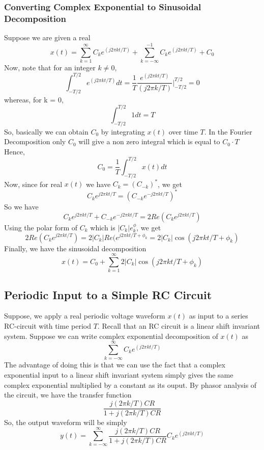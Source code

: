\subsubsection{Converting Complex Exponential to Sinusoidal Decomposition}
Suppose we are given a real $$ x(t) = \sum_{k=1}^{\infty}{C_{k}e^{(j2\pi kt/T)}} + \sum_{k=-\infty}^{-1}{C_{k}e^{(j2\pi kt/T)}} + C_{0}$$
Now, note that for an integer $k \neq 0$, $$\int_{-T/2}^{T/2}e^{(j2\pi kt/T)}dt = \frac{1}{T}\frac{e^{(j2\pi kt/T)}}{(j2\pi k/T)}\Bigg|_{-T/2}^{T/2} = 0$$
whereas, for k = 0, $$\int_{-T/2}^{T/2}1dt = T$$
So, basically we can obtain $C_{0}$ by integrating $x(t)$ over time $T$. In the Fourier Decomposition only $C_{0}$ will give a non zero integral which is equal to $C_{0}\cdot T$
Hence, $$C_{0} = \frac{1}{T}\int_{-T/2}^{T/2}x(t)dt$$
Now, since for real $x(t)$ we have $C_{k} = (C_{-k})^{*}$, we get
$$C_{k}e^{j2\pi kt/T} = (C_{-k}e^{-j2\pi kt/T})^{*}$$ So we have $$C_{k}e^{j2\pi kt/T} + C_{-k}e^{-j2\pi kt/T} = 2 Re (C_{k}e^{j2\pi kt/T})$$
Using the polar form of $C_{k}$ which is $|{C_{k}}|e^\phi_{k}$, we get
$$ 2 Re (C_{k}e^{j2\pi kt/T}) =  2|{C_{k}}|Re(e^{j2\pi kt/T + \phi_{k}} = 2|{C_{k}}|\cos(j2\pi kt/T + \phi_{k})$$
Finally, we have the sinusoidal decomposition
$$x(t) = C_{0} + \sum_{k=1}^{\infty}2|{C_{k}}|\cos(j2\pi kt/T + \phi_{k})$$

\subsection{Periodic Input to a Simple RC Circuit}

Suppose, we apply a real periodic voltage waveform $x(t)$ as input to a series RC-circuit with time period $T$. Recall that an RC circuit is a linear shift invariant system. Suppose we can write complex exponential decomposition of $x(t)$ as $$\sum_{k=-\infty}^{\infty}{C_{k}e^{(j2\pi kt/T)}}$$ The advantage of doing this is that we can use the fact that a complex exponential input to a linear shift invariant system simply gives the same complex exponential multiplied by a constant as its ouput. By phasor analysis of the circuit, we have the transfer function $$ \frac{j(2\pi k/T) CR}{1 + j(2\pi k/T) CR}$$
So, the output waveform will be simply $$y(t) = \sum_{k=-\infty}^{\infty} \frac{j(2\pi k/T) CR}{1 + j(2\pi k/T) CR} {C_{k}e^{(j2\pi kt/T)}}$$


